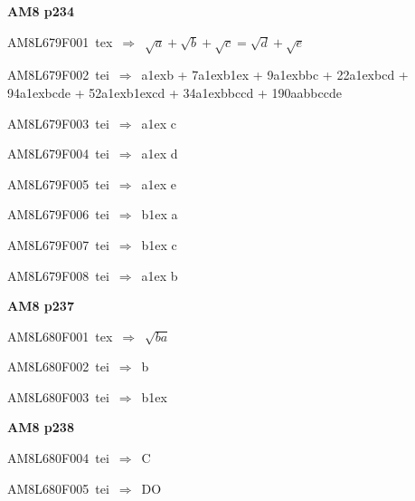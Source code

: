 \par\vfill\eject
{\bf\hfill AM8 p234\hfill\hbox{}}\par\bigskip
{\sixrm AM8L679F001\ {\sixit tex}\ }$\Rightarrow$\ $\sqrt{a} + \sqrt{b} + \sqrt{c} = \sqrt{d} + \sqrt{e}$\par\smallskip
{\sixrm AM8L679F002\ {\sixit tei}\ }$\Rightarrow$\ {\tenit a}\raise1ex\hbox{}{\tenit b} + 7{\tenit a}\raise1ex\hbox{}{\tenit b}\raise1ex\hbox{} + 9{\tenit a}\raise1ex\hbox{}{\tenit bbc} + 22{\tenit a}\raise1ex\hbox{}{\tenit bcd} + 94{\tenit a}\raise1ex\hbox{}{\tenit bcde} 
+ 52{\tenit a}\raise1ex\hbox{}{\tenit b}\raise1ex\hbox{}{\tenit cd} + 34{\tenit a}\raise1ex\hbox{}{\tenit bbccd} + 190{\tenit aabbccde}\par\smallskip
{\sixrm AM8L679F003\ {\sixit tei}\ }$\Rightarrow$\ {\tenit a}\raise1ex\hbox{} {\tenit c}\par\smallskip
{\sixrm AM8L679F004\ {\sixit tei}\ }$\Rightarrow$\ {\tenit a}\raise1ex\hbox{} {\tenit d}\par\smallskip
{\sixrm AM8L679F005\ {\sixit tei}\ }$\Rightarrow$\ {\tenit a}\raise1ex\hbox{} {\tenit e}\par\smallskip
{\sixrm AM8L679F006\ {\sixit tei}\ }$\Rightarrow$\ {\tenit b}\raise1ex\hbox{} {\tenit a}\par\smallskip
{\sixrm AM8L679F007\ {\sixit tei}\ }$\Rightarrow$\ {\tenit b}\raise1ex\hbox{} {\tenit c}\par\smallskip
{\sixrm AM8L679F008\ {\sixit tei}\ }$\Rightarrow$\ {\tenit a}\raise1ex\hbox{} {\tenit b}\par\smallskip

\par\vfill\eject
{\bf\hfill AM8 p237\hfill\hbox{}}\par\bigskip
{\sixrm AM8L680F001\ {\sixit tex}\ }$\Rightarrow$\ $\sqrt{ba}$\par\smallskip
{\sixrm AM8L680F002\ {\sixit tei}\ }$\Rightarrow$\ {\tenit b}\par\smallskip
{\sixrm AM8L680F003\ {\sixit tei}\ }$\Rightarrow$\ {\tenit b}\raise1ex\hbox{}\par\smallskip

\par\vfill\eject
{\bf\hfill AM8 p238\hfill\hbox{}}\par\bigskip
{\sixrm AM8L680F004\ {\sixit tei}\ }$\Rightarrow$\ C\par\smallskip
{\sixrm AM8L680F005\ {\sixit tei}\ }$\Rightarrow$\ DO\par\smallskip

